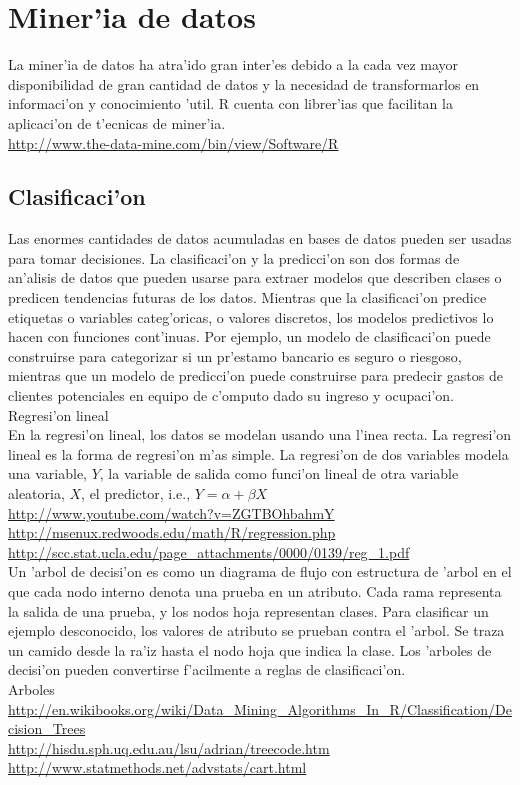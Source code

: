 \chapter{Miner'ia de datos}

La miner'ia de datos ha atra'ido gran inter'es debido a la cada vez mayor disponibilidad de gran cantidad de datos y la necesidad de transformarlos en informaci'on y conocimiento 'util. R cuenta con librer'ias que facilitan la aplicaci'on de t'ecnicas de miner'ia.\\
\url{http://www.the-data-mine.com/bin/view/Software/R}

\section{Clasificaci'on}

Las enormes cantidades de datos acumuladas en bases de datos pueden ser usadas para tomar decisiones. La clasificaci'on y la predicci'on son dos formas de an'alisis de datos que pueden usarse para extraer modelos que describen clases o predicen tendencias futuras de los datos. Mientras que la clasificaci'on predice etiquetas o variables categ'oricas, o valores discretos, los modelos predictivos lo hacen con funciones cont'inuas. Por ejemplo, un modelo de clasificaci'on puede construirse para categorizar si un pr'estamo bancario es seguro o riesgoso, mientras que un modelo de predicci'on puede construirse para predecir gastos de clientes potenciales en equipo de c'omputo dado su ingreso y ocupaci'on. \\

Regresi'on lineal \\
En la regresi'on lineal, los datos se modelan usando una l'inea recta. La regresi'on lineal es la forma de regresi'on m'as simple. La regresi'on de dos variables modela una variable, $Y$, la variable de salida como funci'on lineal de otra variable aleatoria, $X$, el predictor, i.e., $Y = \alpha +  \beta X$\\

\url{http://www.youtube.com/watch?v=ZGTBOhbahmY}\\
\url{http://msenux.redwoods.edu/math/R/regression.php}\\
\url{http://scc.stat.ucla.edu/page_attachments/0000/0139/reg_1.pdf}\\

Un 'arbol de decisi'on es como un diagrama de flujo con estructura de 'arbol en el que cada nodo interno denota una prueba en un atributo. Cada rama representa la salida de una prueba, y los nodos hoja representan clases. Para clasificar un ejemplo desconocido, los valores de atributo se prueban contra el 'arbol. Se traza un camido desde la ra'iz hasta el nodo hoja que indica la clase. Los 'arboles de decisi'on pueden convertirse f'acilmente a reglas de clasificaci'on.\\
Arboles \url{http://en.wikibooks.org/wiki/Data_Mining_Algorithms_In_R/Classification/Decision_Trees}\\
\url{http://hisdu.sph.uq.edu.au/lsu/adrian/treecode.htm}\\
\url{http://www.statmethods.net/advstats/cart.html}\\

